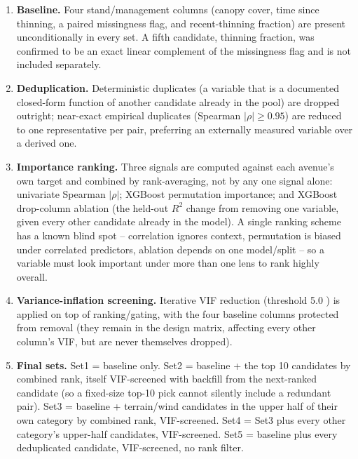 \documentclass[11pt,a4paper]{report}
\begin{document}
\begin{enumerate}
\setlength\itemsep{0pt}
\item \textbf{Baseline.} Four stand/management columns (canopy cover, time since thinning, a
  paired missingness flag, and recent-thinning fraction) are present unconditionally in every
  set. A fifth candidate, thinning fraction, was confirmed to be an exact linear complement of
  the missingness flag and is not included separately.
\item \textbf{Deduplication.} Deterministic duplicates (a variable that is a documented closed-form
  function of another candidate already in the pool) are dropped outright; near-exact empirical
  duplicates (Spearman $|\rho|\geq0.95$) are reduced to one representative per pair, preferring an
  externally measured variable over a derived one.
\item \textbf{Importance ranking.} Three signals are computed against each avenue's own target and
  combined by rank-averaging, not by any one signal alone: univariate Spearman $|\rho|$; XGBoost
  permutation importance; and XGBoost drop-column ablation (the held-out $R^2$ change from
  removing one variable, given every other candidate already in the model). A single ranking
  scheme has a known blind spot -- correlation ignores context, permutation is biased under
  correlated predictors, ablation depends on one model/split -- so a variable must look important
  under more than one lens to rank highly overall.
\item \textbf{Variance-inflation screening.} Iterative VIF reduction (threshold 5.0
  \citep{dormann2013}) is applied on top of ranking/gating, with the four baseline columns
  protected from removal (they remain in the design matrix, affecting every other column's VIF,
  but are never themselves dropped).
\item \textbf{Final sets.} Set1 = baseline only. Set2 = baseline + the top 10 candidates by
  combined rank, itself VIF-screened with backfill from the next-ranked candidate (so a fixed-size
  top-10 pick cannot silently include a redundant pair). Set3 = baseline + terrain/wind
  candidates in the upper half of their own category by combined rank, VIF-screened. Set4 = Set3
  plus every other category's upper-half candidates, VIF-screened. Set5 = baseline plus every
  deduplicated candidate, VIF-screened, no rank filter.
\end{enumerate}
\end{document}
